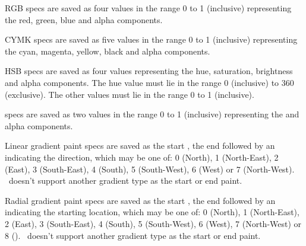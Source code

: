 \begin{deflist}
\begin{itemdesc}
RGB  specs are saved as four  values in the
range 0 to 1 (inclusive) representing the red, green, blue and alpha
components.
\end{itemdesc}

\begin{itemdesc}
CYMK  specs are saved as five  values in the
range 0 to 1 (inclusive) representing the cyan, magenta, yellow, black
and alpha components.
\end{itemdesc}

\begin{itemdesc}
HSB  specs are saved as four  values
representing the hue, saturation, brightness and alpha components.
The hue value must lie in the range 0 (inclusive) to 360
(exclusive). The other values must lie in the range 0 to 1
(inclusive).
\end{itemdesc}

\begin{itemdesc}
 specs are saved as two  values in the range 0 to
1 (inclusive) representing the  and alpha components.
\end{itemdesc}

\begin{itemdesc}
Linear gradient paint specs are saved as the start , the
end  followed by an  indicating the
direction, which may be one of: 0 (North), 1 (North-East), 2 (East),
3 (South-East), 4 (South), 5 (South-West), 6 (West) or 7 (North-West).
\FlowframTk\ doesn't support another gradient type as the
start or end paint.
\end{itemdesc}

\begin{itemdesc}
Radial gradient paint specs are saved as the start , the
end  followed by an  indicating the
starting location, which may be one of: 0 (North), 1 (North-East), 2 (East),
3 (South-East), 4 (South), 5 (South-West), 6 (West), 7 (North-West)
or 8 ().
\FlowframTk\ doesn't support another gradient type as the
start or end paint.
\end{itemdesc}

\end{deflist}

